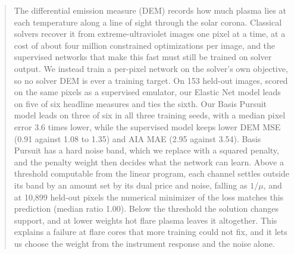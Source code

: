 \begin{abstract}
The differential emission measure (DEM) records how much plasma lies at each temperature along a line of sight through the solar corona. Classical solvers recover it from extreme-ultraviolet images one pixel at a time, at a cost of about four million constrained optimizations per image, and the supervised networks that make this fast must still be trained on solver output. We instead train a per-pixel network on the solver's own objective, so no solver DEM is ever a training target. On 153 held-out images, scored on the same pixels as a supervised emulator, our Elastic Net model leads on five of six headline measures and ties the sixth. Our Basis Pursuit model leads on three of six in all three training seeds, with a median pixel error 3.6 times lower, while the supervised model keeps lower DEM MSE (0.91 against 1.08 to 1.35) and AIA MAE (2.95 against 3.54). Basis Pursuit has a hard noise band, which we replace with a squared penalty, and the penalty weight then decides what the network can learn. Above a threshold computable from the linear program, each channel settles outside its band by an amount set by its dual price and noise, falling as $1/\mu$, and at 10,899 held-out pixels the numerical minimizer of the loss matches this prediction (median ratio 1.00). Below the threshold the solution changes support, and at lower weights hot flare plasma leaves it altogether. This explains a failure at flare cores that more training could not fix, and it lets us choose the weight from the instrument response and the noise alone.
\end{abstract}
